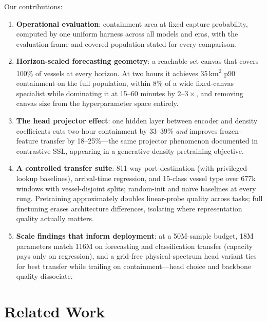 \documentclass{article}
\begin{document}
Our contributions:
\begin{enumerate}
    \item \textbf{Operational evaluation}: containment area at fixed
    capture probability, computed by one uniform harness across all models
    and eras, with the evaluation frame and covered population stated for
    every comparison.

    \item \textbf{Horizon-scaled forecasting geometry}: a reachable-set
    canvas that covers 100\% of vessels at every horizon. At two hours it
    achieves 35\,km\textsuperscript{2} p90 containment on the full
    population, within 8\% of a wide fixed-canvas specialist while
    dominating it at 15--60 minutes by $2$--$3\times$, and removing canvas
    size from the hyperparameter space entirely.

    \item \textbf{The head projector effect}: one hidden layer between
    encoder and density coefficients cuts two-hour containment by
    33--39\% \emph{and} improves frozen-feature transfer by 18--25\%---the
    same projector phenomenon documented in contrastive SSL, appearing in
    a generative-density pretraining objective.

    \item \textbf{A controlled transfer suite}: 811-way port-destination
    (with privileged-lookup baselines), arrival-time regression, and
    15-class vessel type over 677k windows with vessel-disjoint splits;
    random-init and na\"ive baselines at every rung. Pretraining
    approximately doubles linear-probe quality across tasks; full
    finetuning erases architecture differences, isolating where
    representation quality actually matters.

    \item \textbf{Scale findings that inform deployment}: at a 50M-sample
    budget, 18M parameters match 116M on forecasting and classification
    transfer (capacity pays only on regression), and a grid-free
    physical-spectrum head variant ties for best transfer while trailing
    on containment---head choice and backbone quality dissociate.
\end{enumerate}

\section{Related Work}
\end{document}
